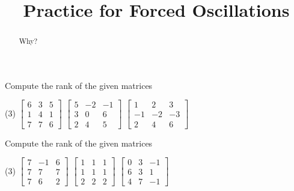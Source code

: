 \documentclass{ximera}
\title{Practice for Forced Oscillations}
\begin{document}
\begin{abstract}
Why?
\end{abstract}
\maketitle

\begin{exercise} \label{exercise:rankmatrix}
    Compute the rank of the given matrices
    \begin{tasks}(3)
        \task
        $\begin{bmatrix}
            6 & 3 & 5 \\
            1 & 4 & 1 \\
            7 & 7 & 6
        \end{bmatrix}$
        \task
        $\begin{bmatrix}
            5 & -2 & -1 \\
            3 & 0 & 6 \\
            2 & 4 & 5
        \end{bmatrix}$
        \task
        $\begin{bmatrix}
            1 & 2 & 3 \\
            -1 & -2 & -3 \\
            2 & 4 & 6
        \end{bmatrix}$
    \end{tasks}
\end{exercise}

\begin{exercise} \label{exercise:rankmatrixans}%
    Compute the rank of the given matrices
    \begin{tasks}(3)
        \task
        $\begin{bmatrix}
            7 & -1 & 6 \\
            7 & 7 & 7 \\
            7 & 6 & 2
        \end{bmatrix}$
        \task
        $\begin{bmatrix}
            1 & 1 & 1 \\
            1 & 1 & 1 \\
            2 & 2 & 2
        \end{bmatrix}$
        \task
        $\begin{bmatrix}
            0 & 3 & -1 \\
            6 & 3 & 1 \\
            4 & 7 & -1
        \end{bmatrix}$
    \end{tasks}
\end{exercise}
\end{document}
